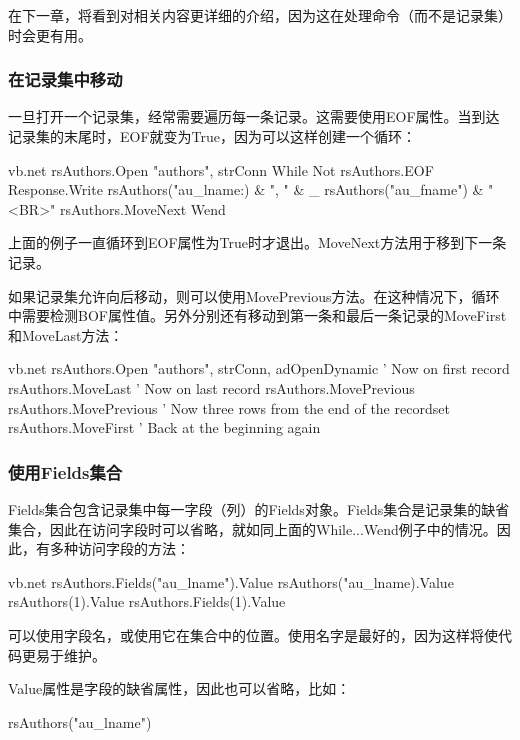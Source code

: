 

在下一章，将看到对相关内容更详细的介绍，因为这在处理命令（而不是记录集）时会更有用。

\subsubsection{在记录集中移动}

一旦打开一个记录集，经常需要遍历每一条记录。这需要使用EOF属性。当到达记录集的末尾时，EOF就变为True，因为可以这样创建一个循环：
\begin{amzcode}{vb.net}
rsAuthors.Open "authors", strConn
While Not rsAuthors.EOF
       Response.Write rsAuthors("au_lname:) & ", " & _
                             rsAuthors("au\_fname") & "{\textless}BR{\textgreater}"
       rsAuthors.MoveNext
Wend
\end{amzcode}
上面的例子一直循环到EOF属性为True时才退出。MoveNext方法用于移到下一条记录。

如果记录集允许向后移动，则可以使用MovePrevious方法。在这种情况下，循环中需要检测BOF属性值。另外分别还有移动到第一条和最后一条记录的MoveFirst和MoveLast方法：
\begin{amzcode}{vb.net}
rsAuthors.Open "authors", strConn, adOpenDynamic
' Now on first record
rsAuthors.MoveLast
' Now on last record
rsAuthors.MovePrevious
rsAuthors.MovePrevious
' Now three rows from the end of the recordset
rsAuthors.MoveFirst
' Back at the beginning again
\end{amzcode}

\subsubsection{使用Fields集合}

Fields集合包含记录集中每一字段（列）的Fields对象。Fields集合是记录集的缺省集合，因此在访问字段时可以省略，就如同上面的While...Wend例子中的情况。因此，有多种访问字段的方法：
\begin{amzcode}{vb.net}
rsAuthors.Fields("au_lname").Value
rsAuthors("au_lname).Value
rsAuthors(1).Value
rsAuthors.Fields(1).Value
\end{amzcode}
可以使用字段名，或使用它在集合中的位置。使用名字是最好的，因为这样将使代码更易于维护。

Value属性是字段的缺省属性，因此也可以省略，比如：

rsAuthors("au\_lname")

